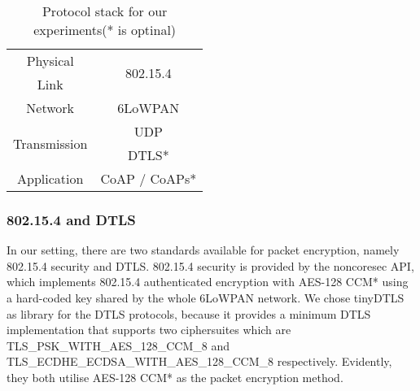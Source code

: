 \begin{table}[!h]
	\centering
	\begin{tabular}{|c|c|}
		\hline
		Physical                        & \multirow{2}{*}{802.15.4} \\ \cline{1-1}
		Link                          &                           \\ \hline
		Network                       & 6LoWPAN                   \\ \hline
		\multirow{2}{*}{Transmission} & UDP                       \\ \cline{2-2} 
		& DTLS*                     \\ \hline
		Application                   & CoAP / CoAPs*             \\ \hline
	\end{tabular}
	
	\caption{Protocol stack for our experiments(* is optinal)\label{Protocols}}
\end{table}


\subsubsection{802.15.4 and DTLS}
In our setting, there are two standards available for packet encryption, namely 802.15.4 security\cite{802154} and DTLS\cite{rfc6347}. 802.15.4 security is provided by the noncoresec\cite{noncoresec} API, which implements 802.15.4 authenticated encryption with AES-128 CCM*\cite{CCM} using a hard-coded key shared by the whole 6LoWPAN network. We chose tinyDTLS\cite{tinydtls}  as library for the DTLS protocols, because it provides a minimum DTLS implementation that supports two ciphersuites which are TLS\_PSK\_WITH\_AES\_128\_CCM\_8\cite{rfc6655} and TLS\_ECDHE\_ECDSA\_WITH\_AES\_128\_CCM\_8\cite{rfc6655} respectively. Evidently, they both utilise AES-128 CCM* as the packet encryption method.